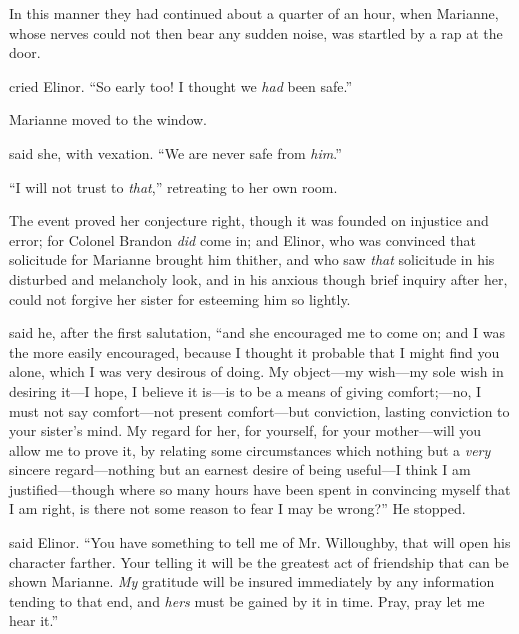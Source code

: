 In this manner they had continued about a quarter of an hour, when Marianne, whose nerves could not then bear any sudden noise, was startled by a rap at the door.

 cried Elinor. “So early too! I thought we {\em had} been safe.”

Marianne moved to the window.

 said she, with vexation. “We are never safe from {\em him}.”


“I will not trust to {\em that},” retreating to her own room. 

The event proved her conjecture right, though it was founded on injustice and error; for Colonel Brandon {\em did} come in; and Elinor, who was convinced that solicitude for Marianne brought him thither, and who saw {\em that} solicitude in his disturbed and melancholy look, and in his anxious though brief inquiry after her, could not forgive her sister for esteeming him so lightly.

 said he, after the first salutation, “and she encouraged me to come on; and I was the more easily encouraged, because I thought it probable that I might find you alone, which I was very desirous of doing. My object---my wish---my sole wish in desiring it---I hope, I believe it is---is to be a means of giving comfort;---no, I must not say comfort---not present comfort---but conviction, lasting conviction to your sister's mind. My regard for her, for yourself, for your mother---will you allow me to prove it, by relating some circumstances which nothing but a {\em very} sincere regard---nothing but an earnest desire of being useful---I think I am justified---though where so many hours have been spent in convincing myself that I am right, is there not some reason to fear I may be wrong?” He stopped.

 said Elinor. “You have something to tell me of Mr. Willoughby, that will open his character farther. Your telling it will be the greatest act of friendship that can be shown Marianne. {\em My} gratitude will be insured immediately by any information tending to that end, and {\em hers} must be gained by it in time. Pray, pray let me hear it.”

